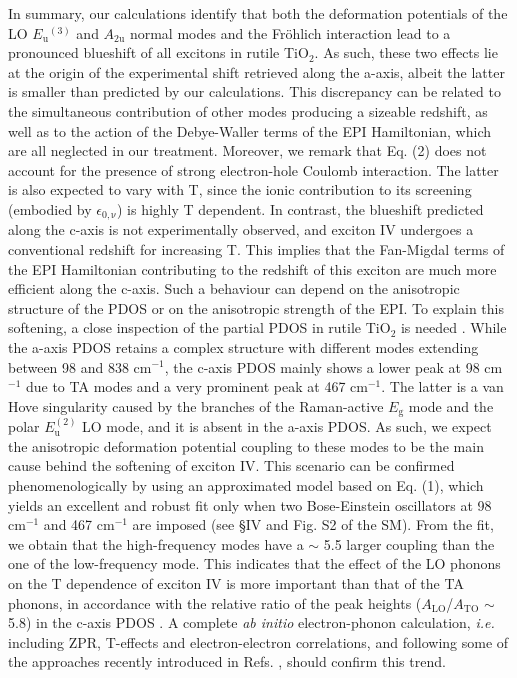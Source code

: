 \documentclass[aps,prl,twocolumn,amsfonts,nobibnotes,superscriptaddress,showpacs]{revtex4-1}
\begin{document}
In summary, our calculations identify that both the deformation potentials of the LO $E\mathrm{_{u}}^{(3)}$ and $A\mathrm{_{2u}}$ normal modes and the Fr\"ohlich interaction lead to a pronounced blueshift of all excitons in rutile TiO$_2$. As such, these two effects lie at the origin of the experimental shift retrieved along the a-axis, albeit the latter is smaller than predicted by our calculations. This discrepancy can be related to the simultaneous contribution of other modes producing a sizeable redshift, as well as to the action of the Debye-Waller terms of the EPI Hamiltonian, which are all neglected in our treatment. Moreover, we remark that Eq. (2) does not account for the presence of strong electron-hole Coulomb interaction. The latter is also expected to vary with T, since the ionic contribution to its screening (embodied by $\epsilon\mathrm{_{0, \nu}}$) is highly T dependent. In contrast, the blueshift predicted along the c-axis is not experimentally observed, and exciton IV undergoes a conventional redshift for increasing T. This implies that the Fan-Migdal terms of the EPI Hamiltonian contributing to the redshift of this exciton are much more efficient along the c-axis. Such a behaviour can depend on the anisotropic structure of the PDOS or on the anisotropic strength of the EPI. To explain this softening, a close inspection of the partial PDOS in rutile TiO$_2$ is needed \cite{traylor1971lattice, sikora2005ab}. While the a-axis PDOS retains a complex structure with different modes extending between 98 and 838 cm$^{-1}$, the c-axis PDOS mainly shows a lower peak at 98 cm$^{-1}$ due to TA modes and a very prominent peak at 467 cm$^{-1}$. The latter is a van Hove singularity caused by the branches of the Raman-active $E\mathrm{_g}$ mode and the polar $E\mathrm{_u^{(2)}}$ LO mode, and it is absent in the a-axis PDOS. As such, we expect the anisotropic deformation potential coupling to these modes to be the main cause behind the softening of exciton IV. This scenario can be confirmed phenomenologically by using an approximated model based on Eq. (1), which yields an excellent and robust fit only when two Bose-Einstein oscillators at 98 cm$^{-1}$ and 467 cm$^{-1}$ are imposed (see \S IV and Fig. S2 of the SM). From the fit, we obtain that the high-frequency modes have a $\sim$ 5.5 larger coupling than the one of the low-frequency mode. This indicates that the effect of the LO phonons on the T dependence of exciton IV is more important than that of the TA phonons, in accordance with the relative ratio of the peak heights ($A\mathrm{_{LO}}$/$A\mathrm{_{TO}}$ $\sim$ 5.8) in the c-axis PDOS \cite{sikora2005ab}. A complete \textit{ab initio} electron-phonon calculation, \textit{i.e.} including ZPR, T-effects and electron-electron correlations, and following some of the approaches recently introduced in Refs. \cite{monserrat2016correlation, zacharias1, zacharias2}, should confirm this trend.
\end{document}
